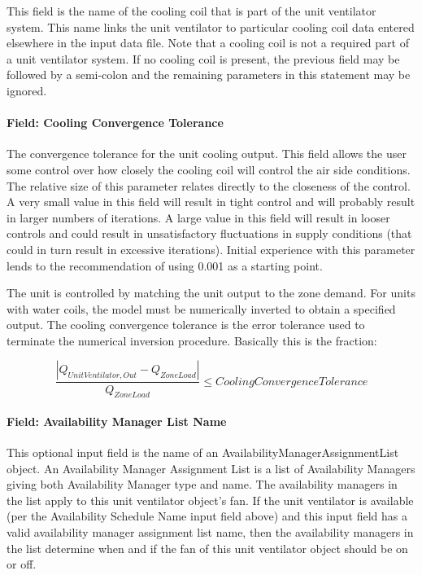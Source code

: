 This field is the name of the cooling coil that is part of the unit ventilator system. This name links the unit ventilator to particular cooling coil data entered elsewhere in the input data file. Note that a cooling coil is not a required part of a unit ventilator system. If no cooling coil is present, the previous field may be followed by a semi-colon and the remaining parameters in this statement may be ignored.

\paragraph{Field: Cooling Convergence Tolerance}\label{field-cooling-convergence-tolerance-1}

The convergence tolerance for the unit cooling output. This field allows the user some control over how closely the cooling coil will control the air side conditions. The relative size of this parameter relates directly to the closeness of the control. A very small value in this field will result in tight control and will probably result in larger numbers of iterations. A large value in this field will result in looser controls and could result in unsatisfactory fluctuations in supply conditions (that could in turn result in excessive iterations). Initial experience with this parameter lends to the recommendation of using 0.001 as a starting point.

The unit is controlled by matching the unit output to the zone demand. For units with water coils, the model must be numerically inverted to obtain a specified output. The cooling convergence tolerance is the error tolerance used to terminate the numerical inversion procedure. Basically this is the fraction:

\begin{equation}
\frac{{\left| {{Q_{UnitVentilator,Out}} - {Q_{ZoneLoad}}} \right|}}{{{Q_{ZoneLoad}}}} \le CoolingConvergenceTolerance
\end{equation}

\paragraph{Field: Availability Manager List Name}\label{field-availability-manager-list-name-1-000}

This optional input field is the name of an AvailabilityManagerAssignmentList object. An Availability Manager Assignment List is a list of Availability Managers giving both Availability Manager type and name. The availability managers in the list apply to this unit ventilator object's fan. If the unit ventilator is available (per the Availability Schedule Name input field above) and this input field has a valid availability manager assignment list name, then the availability managers in the list determine when and if the fan of this unit ventilator object should be on or off.

